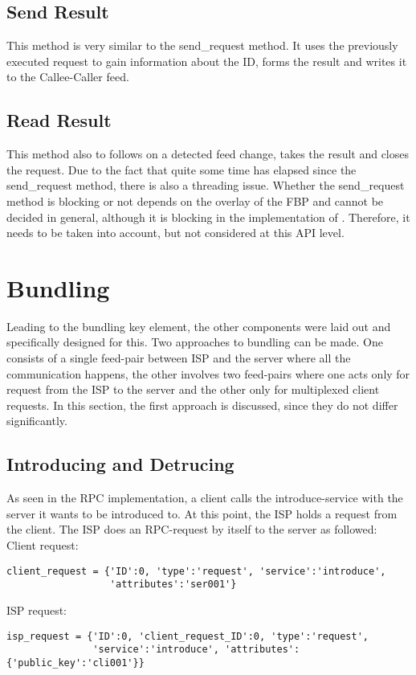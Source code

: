 \subsection{Send Result}

This method is very similar to the send\_request method. It uses the previously executed request to gain information about the ID, forms the result and writes it to the Callee-Caller feed.
\subsection{Read Result}

This method also to follows on a detected feed change, takes the result and closes the request. Due to the fact that quite some time has elapsed since the send\_request method, there is also a threading issue. Whether the send\_request method is blocking or not depends on the overlay of the FBP and cannot be decided in general, although it is blocking in the implementation of \citet{birrell1984implementing}. Therefore, it needs to be taken into account, but not considered at this API level.

\section{Bundling}
Leading to the bundling key element, the other components were laid out and specifically designed for this. Two approaches to bundling can be made. One consists of a single feed-pair between ISP and the server where all the communication happens, the other involves two feed-pairs where one acts only for request from the ISP to the server and the other only for multiplexed client requests. In this section, the first approach is discussed, since they do not differ significantly.
\subsection{Introducing and Detrucing}
As seen in the RPC implementation, a client calls the introduce-service with the server it wants to be introduced to. At this point, the ISP holds a request from the client. The ISP does an RPC-request by itself to the server as followed:
\\
Client request: \begin{lstlisting}
client_request = {'ID':0, 'type':'request', 'service':'introduce', 
                  'attributes':'ser001'}
\end{lstlisting}
ISP request: 
\begin{lstlisting}
isp_request = {'ID':0, 'client_request_ID':0, 'type':'request', 
               'service':'introduce', 'attributes':{'public_key':'cli001'}}
\end{lstlisting}


